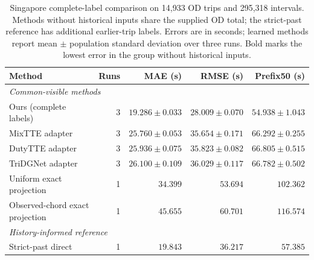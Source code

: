 \begin{table}[t]
\centering\footnotesize\setlength{\tabcolsep}{6pt}
\caption{Singapore complete-label comparison on 14,933 OD trips and 295,318 intervals. Methods without historical inputs share the supplied OD total; the strict-past reference has additional earlier-trip labels. Errors are in seconds; learned methods report mean $\pm$ population standard deviation over three runs. Bold marks the lowest error in the group without historical inputs.}
\label{tab:singapore-common-visible}
\begin{tabular}{lrrrr}
\toprule
Method & Runs & MAE (s) & RMSE (s) & Prefix50 (s)\\
\midrule
\multicolumn{5}{l}{\textit{Common-visible methods}}\\
Ours (complete labels) & 3 & $\mathbf{19.286\pm0.033}$ & $\mathbf{28.009\pm0.070}$ & $\mathbf{54.938\pm1.043}$\\
MixTTE adapter & 3 & $25.760\pm0.053$ & $35.654\pm0.171$ & $66.292\pm0.255$\\
DutyTTE adapter & 3 & $25.936\pm0.075$ & $35.823\pm0.082$ & $66.805\pm0.515$\\
TriDGNet adapter & 3 & $26.100\pm0.109$ & $36.029\pm0.117$ & $66.782\pm0.502$\\
Uniform exact projection & 1 & $34.399$ & $53.694$ & $102.362$\\
Observed-chord exact projection & 1 & $45.655$ & $60.701$ & $116.574$\\
\midrule
\multicolumn{5}{l}{\textit{History-informed reference}}\\
Strict-past direct & 1 & $19.843$ & $36.217$ & $57.385$\\
\bottomrule
\end{tabular}
\end{table}
